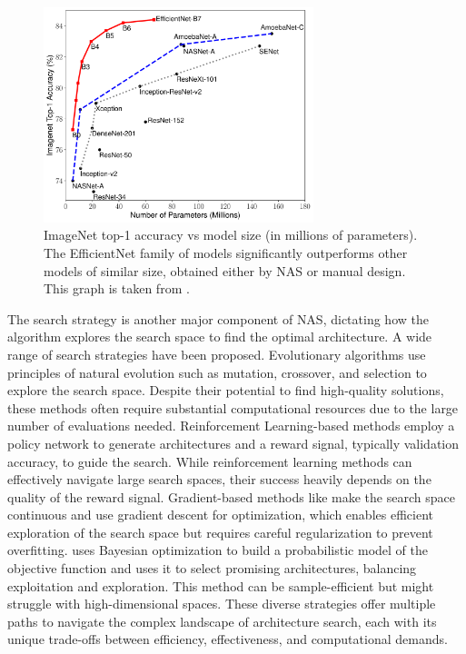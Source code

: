 \begin{figure}[htbp]
    \centering
    \includegraphics[width=0.70\textwidth]{chapter_sota/assets/efficientnet_perfs_overview.pdf}   
    \caption{ImageNet top-1 accuracy vs model size (in millions of parameters).
    The EfficientNet family of models significantly outperforms other models of
    similar size, obtained either by \ac{NAS} or manual design. This graph is
    taken from \cite{DBLP:conf/icml/TanL19}.
    }
    \label{fig:sota:efficientnet_perfs}
\end{figure}


The search strategy is another major component of \ac{NAS}, dictating how the
algorithm explores the search space to find the optimal architecture. A wide
range of search strategies have been proposed. Evolutionary algorithms
\cite{DBLP:conf/icml/RealMSSSTLK17} use principles of natural evolution such as
mutation, crossover, and selection to explore the search space. Despite their
potential to find high-quality solutions, these methods often require
substantial computational resources due to the large number of evaluations
needed. Reinforcement Learning-based methods \cite{DBLP:conf/iclr/ZophL17}
employ a policy network to generate architectures and a reward signal, typically
validation accuracy, to guide the search. While reinforcement learning methods
can effectively navigate large search spaces, their success heavily depends on
the quality of the reward signal. Gradient-based methods like
\cite{DBLP:conf/iclr/LiuSY19,DBLP:conf/iclr/XuX0CQ0X20} make the search space
continuous and use gradient descent for optimization, which enables efficient
exploration of the search space but requires careful regularization to prevent
overfitting. \cite{DBLP:conf/nips/BergstraBBK11} uses Bayesian optimization to
build a probabilistic model of the objective function and uses it to select
promising architectures, balancing exploitation and exploration. This method can
be sample-efficient but might struggle with high-dimensional spaces. These
diverse strategies offer multiple paths to navigate the complex landscape of
architecture search, each with its unique trade-offs between efficiency,
effectiveness, and computational demands.\\


